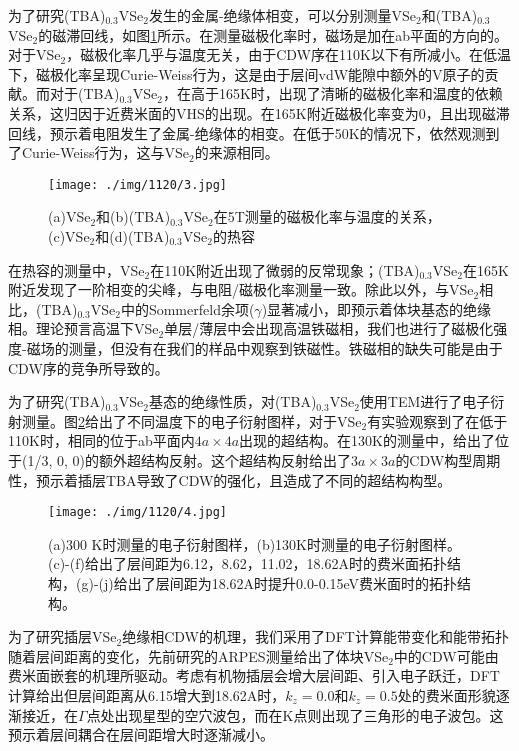 \documentclass[reprint, aps, prb, showkeys, UTF8]{revtex4-2}
\begin{document}
为了研究(TBA)$_{0.3}$VSe$_2$发生的金属-绝缘体相变，可以分别测量VSe$_2$和(TBA)$_{0.3}$VSe$_2$的磁滞回线，如图\ref{fig:susceptibility}所示。在测量磁极化率时，磁场是加在ab平面的方向的。对于VSe$_2$，磁极化率几乎与温度无关，由于CDW序在110K以下有所减小。在低温下，磁极化率呈现Curie-Weiss行为，这是由于层间vdW能隙中额外的V原子的贡献。而对于(TBA)$_{0.3}$VSe$_2$，在高于165K时，出现了清晰的磁极化率和温度的依赖关系，这归因于近费米面的VHS的出现。在165K附近磁极化率变为0，且出现磁滞回线，预示着电阻发生了金属-绝缘体的相变。在低于50K的情况下，依然观测到了Curie-Weiss行为，这与VSe$_2$的来源相同。
\begin{figure}[b]
    \texttt{[image: ./img/1120/3.jpg]}
    \caption{\label{fig:susceptibility}(a)VSe$_2$和(b)(TBA)$_{0.3}$VSe$_2$在5T测量的磁极化率与温度的关系，(c)VSe$_2$和(d)(TBA)$_{0.3}$VSe$_2$的热容}
\end{figure}

在热容的测量中，VSe$_2$在110K附近出现了微弱的反常现象；(TBA)$_{0.3}$VSe$_2$在165K附近发现了一阶相变的尖峰，与电阻/磁极化率测量一致。除此以外，与VSe$_2$相比，(TBA)$_{0.3}$VSe$_2$中的Sommerfeld余项($\gamma$)显著减小，即预示着体块基态的绝缘相。理论预言高温下VSe$_2$单层/薄层中会出现高温铁磁相，我们也进行了磁极化强度-磁场的测量，但没有在我们的样品中观察到铁磁性。铁磁相的缺失可能是由于CDW序的竞争所导致的。

为了研究(TBA)$_{0.3}$VSe$_2$基态的绝缘性质，对(TBA)$_{0.3}$VSe$_2$使用TEM进行了电子衍射测量。图\ref{fig:diffraction}给出了不同温度下的电子衍射图样，对于VSe$_2$有实验观察到了在低于110K时，相同的位于ab平面内$4a \times 4a$出现的超结构。在130K的测量中，给出了位于(1/3, 0, 0)的额外超结构反射。这个超结构反射给出了$3a \times 3a$的CDW构型周期性，预示着插层TBA导致了CDW的强化，且造成了不同的超结构构型。
\begin{figure}[t]
    \texttt{[image: ./img/1120/4.jpg]}
    \caption{\label{fig:diffraction}(a)300 K时测量的电子衍射图样，(b)130K时测量的电子衍射图样。(c)-(f)给出了层间距为6.12，8.62，11.02，18.62A时的费米面拓扑结构，(g)-(j)给出了层间距为18.62A时提升0.0-0.15eV费米面时的拓扑结构。}
\end{figure}


为了研究插层VSe$_2$绝缘相CDW的机理，我们采用了DFT计算能带变化和能带拓扑随着层间距离的变化，先前研究的ARPES测量给出了体块VSe$_2$中的CDW可能由费米面嵌套的机理所驱动。考虑有机物插层会增大层间距、引入电子跃迁，DFT计算给出但层间距离从6.15增大到18.62A时，$k_z = 0.0$和$k_z = 0.5$处的费米面形貌逐渐接近，在$\Gamma$点处出现星型的空穴波包，而在K点则出现了三角形的电子波包。这预示着层间耦合在层间距增大时逐渐减小。
\end{document}
